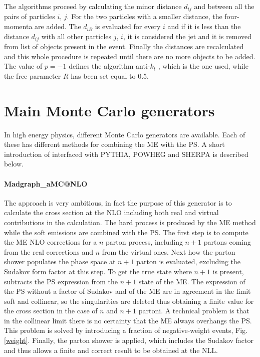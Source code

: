 The algorithms proceed by calculating the minor distance $ d_{ij} $ and between all the pairs of particles $ i $, $ j $. For the two particles with a smaller distance, the four-momenta are added. The $ d_{iB} $ is evaluated for every $ i $ and if it is less than the distance $ d_{ij} $ with all other particles $ j $, $ i $,  it is considered the jet and it is removed from list of objects present in the event.
Finally the distances are recalculated and this whole procedure is repeated until there are no more objects to be added.
The value of $ p = -1 $ defines the algorithm anti-$k_t $ \cite{Cacciari: 2008gp}, which is the one used, while the free parameter $ R $ has been set equal to 0.5.




\section{Main Monte Carlo generators }
In high energy physics, different Monte Carlo generators are available. Each of these has different methods for combining the ME with the PS.
A short introduction of  \aMC interfaced with P{\footnotesize YTHIA}, P{\footnotesize OWHEG}  and S{\footnotesize HERPA} is described below. 
 
 
\paragraph{Madgraph\_aM{\footnotesize C@NLO}}
The \aMC \cite{bib:madgraph} approach is very ambitious, in fact the purpose of this generator is to calculate the cross section at the NLO including both real and virtual contributions in the calculation. The  hard process is produced by the ME method while the soft emissions are combined with the PS.
The first step is to compute the ME NLO corrections for a $ n $ parton process, including $ n + 1 $ partons coming from the real corrections and $ n $ from the virtual ones. Next  how the parton shower populates the phase space at $ n + 1 $ parton is evaluated, excluding the Sudakov form factor at this step. To get the  true  state where $ n + 1 $ is present, \aMC subtracts the PS expression from the $ n + 1 $ state of the ME. The expression of the PS without a factor of Sudakov and of the ME are in agreement in the limit soft and collinear, so the singularities are deleted thus obtaining a finite value for the cross section in the case of $ n $ and $ n + 1 $ partoni. A technical problem is that in the collinear limit there is no certainty that the ME always overhangs the PS. This problem is solved by introducing a fraction of negative-weight events, Fig. \ref{weight}. Finally, the parton shower is applied, which includes the Sudakov factor and thus allows a finite and correct result to be obtained at the NLL. 
 
